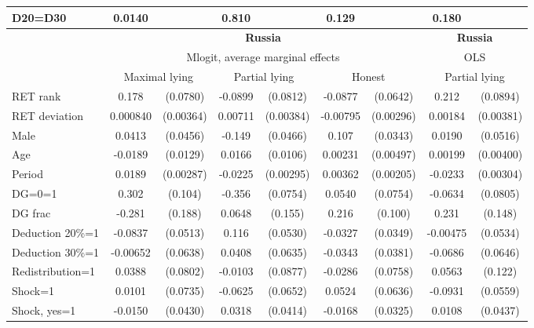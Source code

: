\begin{tabular}{l|cccccc|cc}
D20=D30         &   0.0140         &         &    0.810         &         &    0.129         &         &    0.180         &         \\
\hline\hline
&\multicolumn{6}{c|}{\bf Russia}&\multicolumn{2}{c}{\bf Russia}\\ &\multicolumn{6}{c|}{Mlogit, average marginal effects }&\multicolumn{2}{c}{OLS}\\
                &\multicolumn{2}{c}{Maximal lying}&\multicolumn{2}{c}{Partial lying}&\multicolumn{2}{c}{Honest}  &\multicolumn{2}{c}{Partial lying}\\
\hline
RET rank        &    0.178\sym{**} & (0.0780)&  -0.0899         & (0.0812)&  -0.0877         & (0.0642)&    0.212\sym{**} & (0.0894)\\
RET deviation   & 0.000840         &(0.00364)&  0.00711\sym{*}  &(0.00384)& -0.00795\sym{***}&(0.00296)&  0.00184         &(0.00381)\\
Male            &   0.0413         & (0.0456)&   -0.149\sym{***}& (0.0466)&    0.107\sym{***}& (0.0343)&   0.0190         & (0.0516)\\
Age             &  -0.0189         & (0.0129)&   0.0166         & (0.0106)&  0.00231         &(0.00497)&  0.00199         &(0.00400)\\
Period          &   0.0189\sym{***}&(0.00287)&  -0.0225\sym{***}&(0.00295)&  0.00362\sym{*}  &(0.00205)&  -0.0233\sym{***}&(0.00304)\\
DG=0=1          &    0.302\sym{***}&  (0.104)&   -0.356\sym{***}& (0.0754)&   0.0540         & (0.0754)&  -0.0634         & (0.0805)\\
DG frac         &   -0.281         &  (0.188)&   0.0648         &  (0.155)&    0.216\sym{**} &  (0.100)&    0.231         &  (0.148)\\
Deduction 20\%=1&  -0.0837         & (0.0513)&    0.116\sym{**} & (0.0530)&  -0.0327         & (0.0349)& -0.00475         & (0.0534)\\
Deduction 30\%=1& -0.00652         & (0.0638)&   0.0408         & (0.0635)&  -0.0343         & (0.0381)&  -0.0686         & (0.0646)\\
Redistribution=1&   0.0388         & (0.0802)&  -0.0103         & (0.0877)&  -0.0286         & (0.0758)&   0.0563         &  (0.122)\\
Shock=1         &   0.0101         & (0.0735)&  -0.0625         & (0.0652)&   0.0524         & (0.0636)&  -0.0931\sym{*}  & (0.0559)\\
Shock, yes=1    &  -0.0150         & (0.0430)&   0.0318         & (0.0414)&  -0.0168         & (0.0325)&   0.0108         & (0.0437)\\

\end{tabular}
